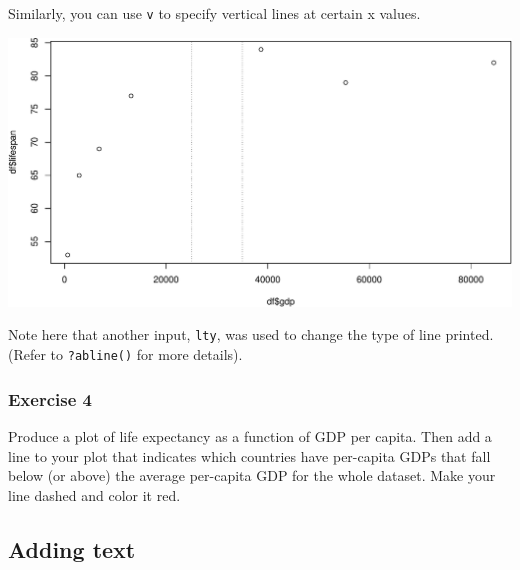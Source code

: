 \documentclass[
]{book}
\newenvironment{Shaded}{\begin{snugshade}}{\end{snugshade}}
\newcommand{\DataTypeTok}[1]{\textcolor[rgb]{0.13,0.29,0.53}{#1}}
\newcommand{\DecValTok}[1]{\textcolor[rgb]{0.00,0.00,0.81}{#1}}
\newcommand{\KeywordTok}[1]{\textcolor[rgb]{0.13,0.29,0.53}{\textbf{#1}}}
\newcommand{\NormalTok}[1]{#1}
\newcommand{\OperatorTok}[1]{\textcolor[rgb]{0.81,0.36,0.00}{\textbf{#1}}}
\newcommand{\StringTok}[1]{\textcolor[rgb]{0.31,0.60,0.02}{#1}}
\begin{document}
Similarly, you can use \texttt{v} to specify vertical lines at certain x values.

\begin{Shaded}
\end{Shaded}

\includegraphics{figures/unnamed-chunk-119-1.pdf}

Note here that another input, \texttt{lty}, was used to change the type of line printed. (Refer to \texttt{?abline()} for more details).

\hypertarget{exercise-4-1}{%
\subsubsection*{Exercise 4}\label{exercise-4-1}}

Produce a plot of life expectancy as a function of GDP per capita. Then add a line to your plot that indicates which countries have per-capita GDPs that fall below (or above) the average per-capita GDP for the whole dataset. Make your line dashed and color it red.

\hypertarget{adding-text}{%
\subsection*{Adding text}\label{adding-text}}
\end{document}
